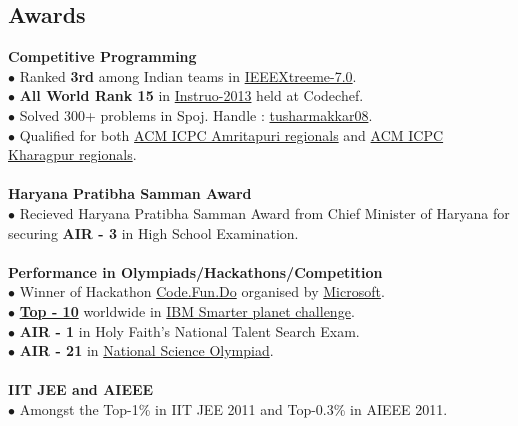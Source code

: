 \documentclass[margin,line]{resume}
\begin{document}
\begin{resume}
  \section{\mysidestyle \bf Awards}
  {\bf Competitive Programming } 
 \\$\bullet$ Ranked {\bfseries 3rd} among Indian teams in \href{http://www.ieee.org/membership_services/membership/students/competitions/xtreme/index.html}{IEEEXtreeme-7.0}.
    \\$\bullet$ {\bfseries All World Rank 15} in \href{http://www.codechef.com/rankings/INST2013/}{Instruo-2013} held at Codechef.
\\$\bullet$ Solved 300+ problems in Spoj. Handle :  \href{http://www.spoj.com/users/tusharmakkar08/}{tusharmakkar08}.
    \\$\bullet$ Qualified for both \href{icpc.amrita.ac.in}{ACM ICPC Amritapuri regionals} and \href{http://acm.iitkgp.ac.in/}{ACM ICPC Kharagpur regionals}.
\\\\    {\bf Haryana Pratibha Samman Award}
     \\$\bullet$ Recieved Haryana Pratibha Samman Award from Chief Minister of Haryana for securing {\bfseries AIR - 3} in High School Examination.
\\\\ {\bf Performance in Olympiads/Hackathons/Competition }
     \\$\bullet$ Winner of Hackathon \href{https://www.acadaccelerator.com/Home/Events}{Code.Fun.Do} organised by \href{http://www.microsoft.com/en-in/msidc/default.aspx}{Microsoft}.
    \\$\bullet$ \href{https://timesofindia.indiatimes.com/city/mangaluru/Mangalore-students-take-eco-literacy-online/articleshow/24455031.cms}{\bfseries{Top - 10}} worldwide in \href{http://www.ibm.com/ibm/history/ibm100/us/en/icons/smarterplanet/}{IBM Smarter planet challenge}.
\\$\bullet$ {\bfseries AIR - 1} in Holy Faith's National Talent Search Exam.
    \\$\bullet$ {\bfseries AIR - 21} in \href{http://www.sofworld.org/nso}{National Science Olympiad}.
    \\ \\  {\bf IIT JEE and AIEEE  } 
     \\$\bullet$ Amongst the  Top-1\% in IIT JEE 2011 and Top-0.3\% in AIEEE 2011.




         

\end{resume}
\end{document}
